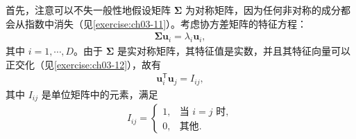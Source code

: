 \documentclass[../../main.tex]{subfiles}
\begin{document}
首先，注意可以不失一般性地假设矩阵 $\boldsymbol{\Sigma}$ 为对称矩阵，因为任何非对称的成分都会从指数中消失（见\cref{exercise:ch03-11}）。考虑协方差矩阵的特征方程：
\begin{align}
\boldsymbol{\Sigma}\boldsymbol{u}_{i}=\lambda_{i}\boldsymbol{u}_{i},
\label{align:ch03-特征方程}
\end{align}
其中 $i=1,\cdots,D$。由于 $\boldsymbol{\Sigma}$ 是实对称矩阵，其特征值是实数，并且其特征向量可以正交化（见\cref{exercise:ch03-12}），故有
\begin{align}
\boldsymbol{u}_{i}^{\mathsf{T}}\boldsymbol{u}_{j}=I_{ij},
\label{align:ch03-特征向量正交}
\end{align}
其中 $I_{ij}$ 是单位矩阵中的元素，满足
\begin{align}
I_{ij}=\begin{cases}1, & \text{当 } i=j \text{ 时},\\ 0, & \text{其他}.\end{cases}
\label{align:ch03-单位矩阵元素}
\end{align}
\end{document}
